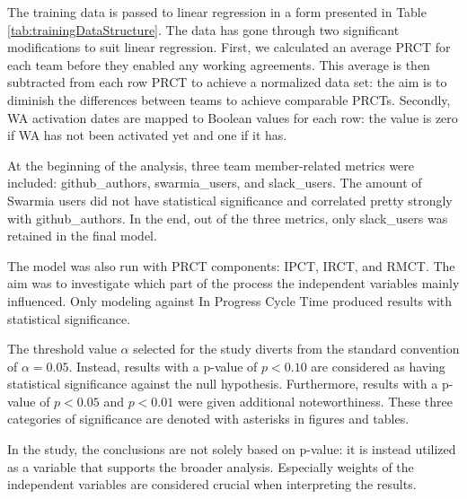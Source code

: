 The training data is passed to linear regression in a form presented in Table \ref{tab:trainingDataStructure}. The data has gone through two significant modifications to suit linear regression. First, we calculated an average PRCT for each team before they enabled any working agreements. This average is then subtracted from each row PRCT to achieve a normalized data set: the aim is to diminish the differences between teams to achieve comparable PRCTs. Secondly, WA activation dates are mapped to Boolean values for each row: the value is zero if WA has not been activated yet and one if it has.



At the beginning of the analysis, three team member-related metrics were included: github\_authors, swarmia\_users, and slack\_users. The amount of Swarmia users did not have statistical significance and correlated pretty strongly with github\_authors. In the end, out of the three metrics, only slack\_users was retained in the final model.

The model was also run with PRCT components: IPCT, IRCT, and RMCT. The aim was to investigate which part of the process the independent variables mainly influenced. Only modeling against In Progress Cycle Time produced results with statistical significance. 

The threshold value $\alpha$ selected for the study diverts from the standard convention of $\alpha=0.05$. Instead, results with a p-value of $p<0.10$ are considered as having statistical significance against the null hypothesis. Furthermore, results with a p-value of $p<0.05$ and $p<0.01$ were given additional noteworthiness. These three categories of significance are denoted with asterisks in figures and tables. 

In the study, the conclusions are not solely based on p-value: it is instead utilized as a variable that supports the broader analysis. Especially weights of the independent variables are considered crucial when interpreting the results. 

